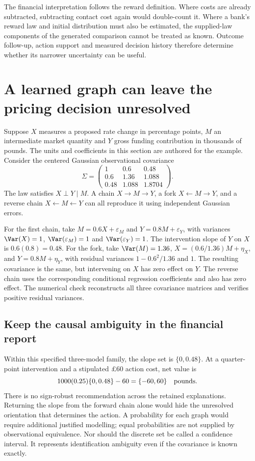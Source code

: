The financial interpretation follows the reward definition. Where costs are
already subtracted, subtracting contact cost again would double-count it.
Where a bank's reward law and initial distribution must also be estimated,
the supplied-law components of the generated comparison cannot be treated
as known. Outcome follow-up, action support and measured decision history
therefore determine whether its narrower uncertainty can be useful.

\chapter{A learned graph can leave the pricing decision unresolved}
\label{rewrite:discovery}

Suppose $X$ measures a proposed rate change in percentage points, $M$ an
intermediate market quantity and $Y$ gross funding contribution in thousands
of pounds. The units and coefficients in this section are authored for the
example. Consider the centered Gaussian observational covariance
\[
 \Sigma=\begin{pmatrix}
 1&0.6&0.48\\0.6&1.36&1.088\\0.48&1.088&1.8704
 \end{pmatrix}.
\]
The law satisfies $X\perp Y\mid M$. A chain $X\to M\to Y$, a
fork $X\leftarrow M\to Y$, and a reverse chain $X\leftarrow M\leftarrow Y$
can all reproduce it using independent Gaussian errors.

For the first chain, take $M=0.6X+\varepsilon_M$ and
$Y=0.8M+\varepsilon_Y$, with variances $\Var(X)=1$,
$\Var(\varepsilon_M)=1$ and $\Var(\varepsilon_Y)=1$. The intervention
slope of $Y$ on $X$ is $0.6(0.8)=0.48$. For the fork, take
$\Var(M)=1.36$, $X=(0.6/1.36)M+\eta_X$, and $Y=0.8M+\eta_Y$,
with residual variances $1-0.6^2/1.36$ and $1$. The resulting covariance
is the same, but intervening on $X$ has zero effect on $Y$. The reverse
chain uses the corresponding conditional regression coefficients and also
has zero effect. The numerical check reconstructs all three covariance
matrices and verifies positive residual variances.

\section{Keep the causal ambiguity in the financial report}
Within this specified three-model family, the slope set is $\{0,0.48\}$.
At a quarter-point intervention and a stipulated \pounds60 action cost,
net value is
\[
 1000(0.25)\{0,0.48\}-60=\{-60,60\}
 \quad\hbox{pounds}.
\]
There is no sign-robust recommendation across the retained explanations.
Returning the slope from the forward chain alone would hide the unresolved
orientation that determines the action. A probability for each graph would
require additional justified modelling; equal probabilities are not supplied
by observational equivalence. Nor should the discrete set be called a
confidence interval. It represents identification ambiguity even if the
covariance is known exactly.

